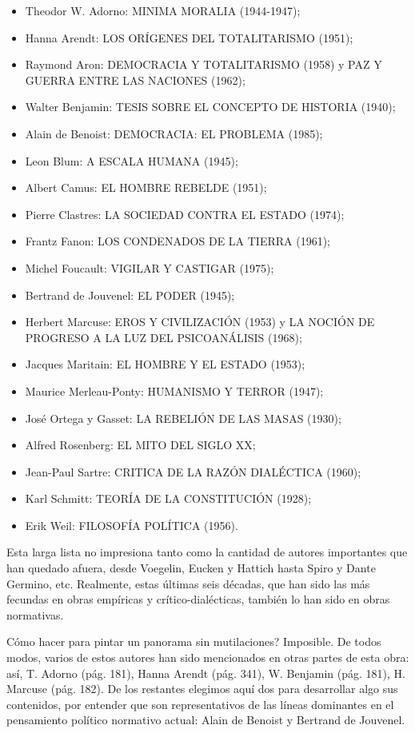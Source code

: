 \documentclass[
]{book}
\providecommand{\tightlist}{%
  \setlength{\itemsep}{0pt}\setlength{\parskip}{0pt}}
\begin{document}
\begin{itemize}
\tightlist
\item
  Theodor W. Adorno: MINIMA MORALIA (1944-1947);
\item
  Hanna Arendt: LOS ORÍGENES DEL TOTALITARISMO (1951);
\item
  Raymond Aron: DEMOCRACIA Y TOTALITARISMO (1958) y PAZ Y GUERRA ENTRE LAS NACIONES (1962);
\item
  Walter Benjamin: TESIS SOBRE EL CONCEPTO DE HISTORIA (1940);
\item
  Alain de Benoist: DEMOCRACIA: EL PROBLEMA (1985);
\item
  Leon Blum: A ESCALA HUMANA (1945);
\item
  Albert Camus: EL HOMBRE REBELDE (1951);
\item
  Pierre Clastres: LA SOCIEDAD CONTRA EL ESTADO (1974);
\item
  Frantz Fanon: LOS CONDENADOS DE LA TIERRA (1961);
\item
  Michel Foucault: VIGILAR Y CASTIGAR (1975);
\item
  Bertrand de Jouvenel: EL PODER (1945);
\item
  Herbert Marcuse: EROS Y CIVILIZACIÓN (1953) y LA NOCIÓN DE PROGRESO A LA LUZ DEL PSICOANÁLISIS (1968);
\item
  Jacques Maritain: EL HOMBRE Y EL ESTADO (1953);
\item
  Maurice Merleau-Ponty: HUMANISMO Y TERROR (1947);
\item
  José Ortega y Gasset: LA REBELIÓN DE LAS MASAS (1930);
\item
  Alfred Rosenberg: EL MITO DEL SIGLO XX;
\item
  Jean-Paul Sartre: CRITICA DE LA RAZÓN DIALÉCTICA (1960);
\item
  Karl Schmitt: TEORÍA DE LA CONSTITUCIÓN (1928);
\item
  Erik Weil: FILOSOFÍA POLÍTICA (1956).
\end{itemize}

Esta larga lista no impresiona tanto como la cantidad de autores importantes que han quedado afuera, desde Voegelin, Eucken y Hattich hasta Spiro y Dante Germino, etc. Realmente, estas últimas seis décadas, que han sido las más fecundas en obras empíricas y crítico-dialécticas, también lo han sido en obras normativas.

Cómo hacer para pintar un panorama sin mutilaciones? Imposible. De todos modos, varios de estos autores han sido mencionados en otras partes de esta obra: así, T. Adorno (pág. 181), Hanna Arendt (pág. 341), W. Benjamin (pág. 181), H. Marcuse (pág. 182). De los restantes elegimos aquí dos para desarrollar algo sus contenidos, por entender que son representativos de las líneas dominantes en el pensamiento político normativo actual: Alain de Benoist y Bertrand de Jouvenel.
\end{document}

